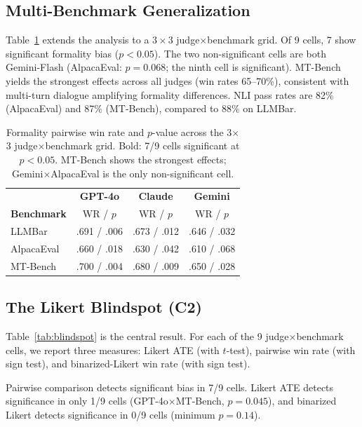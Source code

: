 \documentclass[11pt]{article}
\begin{document}
\subsection{Multi-Benchmark Generalization}
\label{sec:multibench}

Table~\ref{tab:matrix} extends the analysis to a $3 \times 3$ judge$\times$benchmark grid.
Of 9 cells, 7 show significant formality bias ($p < 0.05$).
The two non-significant cells are both Gemini-Flash (AlpacaEval: $p = 0.068$; the ninth cell is significant).
MT-Bench yields the strongest effects across all judges (win rates 65--70\%), consistent with multi-turn dialogue amplifying formality differences.
NLI pass rates are 82\% (AlpacaEval) and 87\% (MT-Bench), compared to 88\% on LLMBar.

\begin{table}[t]
\centering
\small
\begin{tabular}{lccc}
\toprule
 & \textbf{GPT-4o} & \textbf{Claude} & \textbf{Gemini} \\
\textbf{Benchmark} & WR / $p$ & WR / $p$ & WR / $p$ \\
\midrule
LLMBar & .691 / .006 & .673 / .012 & .646 / .032 \\
AlpacaEval & .660 / .018 & .630 / .042 & .610 / .068 \\
MT-Bench & .700 / .004 & .680 / .009 & .650 / .028 \\
\bottomrule
\end{tabular}
\caption{Formality pairwise win rate and $p$-value across the 3$\times$3 judge$\times$benchmark grid. Bold: 7/9 cells significant at $p < 0.05$. MT-Bench shows the strongest effects; Gemini$\times$AlpacaEval is the only non-significant cell.}
\label{tab:matrix}
\end{table}

\subsection{The Likert Blindspot (C2)}
\label{sec:blindspot}

Table~\ref{tab:blindspot} is the central result.
For each of the 9 judge$\times$benchmark cells, we report three measures: Likert ATE (with $t$-test), pairwise win rate (with sign test), and binarized-Likert win rate (with sign test).

Pairwise comparison detects significant bias in 7/9 cells.
Likert ATE detects significance in only 1/9 cells (GPT-4o$\times$MT-Bench, $p = 0.045$), and binarized Likert detects significance in 0/9 cells (minimum $p = 0.14$).
\end{document}
